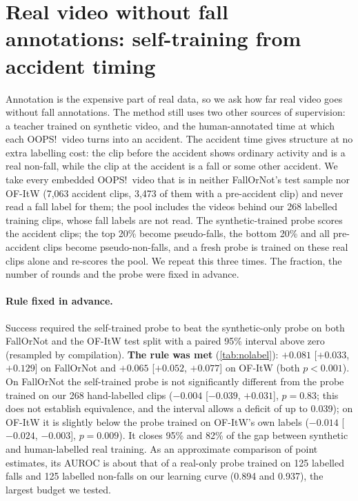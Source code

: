 \documentclass[10pt,twocolumn,letterpaper]{article}
\begin{document}
\section{Real video without fall annotations: self-training from accident timing}\label{sec:nolabel}
Annotation is the expensive part of real data, so we ask how far real video goes without fall annotations. The method still uses two other sources of supervision: a teacher trained on synthetic video, and the human-annotated time at which each OOPS!\ video turns into an accident. The accident time gives structure at no extra labelling cost: the clip before the accident shows ordinary activity and is a real non-fall, while the clip at the accident is a fall or some other accident. We take every embedded OOPS!\ video that is in neither FallOrNot's test sample nor OF-ItW (7,063 accident clips, 3,473 of them with a pre-accident clip) and never read a fall label for them; the pool includes the videos behind our 268 labelled training clips, whose fall labels are not read. The synthetic-trained probe scores the accident clips; the top 20\% become pseudo-falls, the bottom 20\% and all pre-accident clips become pseudo-non-falls, and a fresh probe is trained on these real clips alone and re-scores the pool. We repeat this three times. The fraction, the number of rounds and the probe were fixed in advance.

\paragraph{Rule fixed in advance.} Success required the self-trained probe to beat the synthetic-only probe on both FallOrNot and the OF-ItW test split with a paired 95\% interval above zero (resampled by compilation). \textbf{The rule was met} (\cref{tab:nolabel}): $+0.081$ [$+0.033$, $+0.129$] on FallOrNot and $+0.065$ [$+0.052$, $+0.077$] on OF-ItW (both $p<0.001$). On FallOrNot the self-trained probe is not significantly different from the probe trained on our 268 hand-labelled clips ($-0.004$ [$-0.039$, $+0.031$], $p=0.83$; this does not establish equivalence, and the interval allows a deficit of up to 0.039); on OF-ItW it is slightly below the probe trained on OF-ItW's own labels ($-0.014$ [$-0.024$, $-0.003$], $p=0.009$). It closes 95\% and 82\% of the gap between synthetic and human-labelled real training. As an approximate comparison of point estimates, its AUROC is about that of a real-only probe trained on 125 labelled falls and 125 labelled non-falls on our learning curve (0.894 and 0.937), the largest budget we tested.
\end{document}
